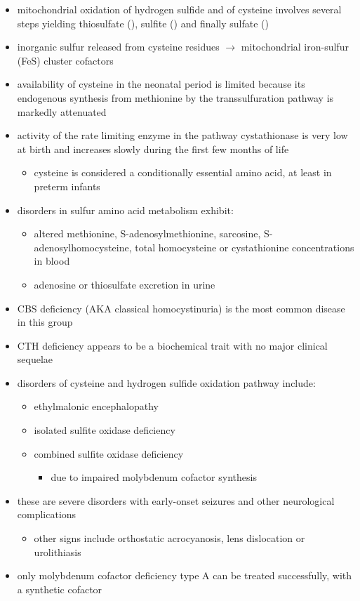 \documentclass{scrartcl}
\begin{document}
\begin{itemize}
\begin{itemize}
\end{itemize}
\item mitochondrial oxidation of hydrogen sulfide and of cysteine involves
several steps yielding thiosulfate (), sulfite
() and finally sulfate ()
\item inorganic sulfur released from cysteine residues \(\to\) mitochondrial
iron-sulfur (FeS) cluster cofactors
\item availability of cysteine in the neonatal period is limited because
its endogenous synthesis from methionine by the transsulfuration
pathway is markedly attenuated
\item activity of the rate limiting enzyme in the pathway cystathionase is
very low at birth and increases slowly during the first few months
of life
\begin{itemize}
\item cysteine is considered a conditionally essential amino acid, at
least in preterm infants
\end{itemize}

\item disorders in sulfur amino acid metabolism exhibit:
\begin{itemize}
\item altered methionine, S-adenosylmethionine, sarcosine, S-adenosylhomocysteine,
total homocysteine or cystathionine concentrations in blood
\item adenosine or thiosulfate excretion in urine
\end{itemize}
\end{itemize}


\begin{itemize}
\item CBS deficiency (AKA classical homocystinuria) is the most common
disease in this group
\item CTH deficiency appears to be a biochemical trait with no major
clinical sequelae
\item disorders of cysteine and hydrogen sulfide oxidation pathway include:
\begin{itemize}
\item ethylmalonic encephalopathy
\item isolated sulfite oxidase deficiency
\item combined sulfite oxidase deficiency
\begin{itemize}
\item due to impaired molybdenum cofactor synthesis
\end{itemize}
\end{itemize}
\item these are severe disorders with early-onset seizures and other
neurological complications
\begin{itemize}
\item other signs include orthostatic acrocyanosis, lens dislocation or
urolithiasis
\end{itemize}
\item only molybdenum cofactor deficiency type A can be treated
successfully, with a synthetic cofactor
\end{itemize}
\end{document}
